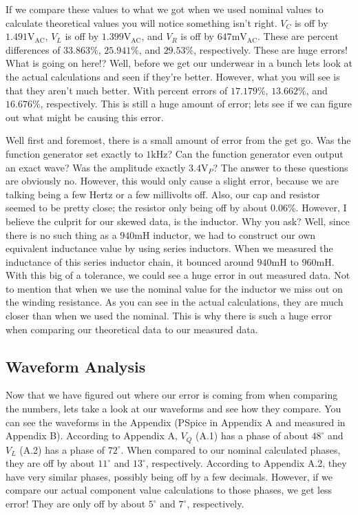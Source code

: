 \documentclass[12pt,a4paper,titlepage]{article}
\begin{document}
If we compare these values to what we got when we used nominal values to
calculate theoretical values you will notice something isn't right. $V_C$ is off
by $1.491\si{\volt}_\text{AC}$, $V_L$ is off by $1.399\si{\volt}_\text{AC}$, and $V_R$ is off by $647\si{\milli \volt}_\text{AC}$.
These are percent differences of $33.863\%$, $25.941\%$, and $29.53\%$,
respectively. These are huge errors! What is going on here!? Well, before we
get our underwear in a bunch lets look at the actual calculations and seen if
they're better. However, what you will see is that they aren't much better.
With percent errors of $17.179\%$, $13.662\%$, and $16.676\%$, respectively.
This is still a huge amount of error; lets see if we can figure out what might
be causing this error.

Well first and foremost, there is a small amount of error from the get go. Was
the function generator set exactly to $1\si{\kilo \hertz}$? Can the function generator even
output an exact wave? Was the amplitude exactly $3.4\si{\volt}_{P}$? The answer to these
questions are obviously no. However, this would only cause a slight error,
because we are talking being a few Hertz or a few millivolts off. Also, our
cap and resistor seemed to be pretty close; the resistor only being off by about
$0.06\%$. However, I believe the culprit for our skewed data, is the inductor.
Why you ask? Well, since there is no such thing as a $940\si{\milli \henry}$ inductor, we had
to construct our own equivalent inductance value by using series inductors.
When we measured the inductance of this series inductor chain, it bounced around
$940\si{\milli \henry}$ to $960\si{\milli \henry}$. With this big of a tolerance, we could see a huge error in
out measured data. Not to mention that when we use the nominal value for the
inductor we miss out on the winding resistance. As you can see in the actual
calculations, they are much closer than when we used the nominal.
This is why there is such a huge error when comparing our theoretical data to
our measured data.

\subsection{Waveform Analysis}
Now that we have figured out where our error is coming from when comparing the
numbers, lets take a look at our waveforms and see how they compare. You can see
the waveforms in the Appendix (PSpice in Appendix A and measured in Appendix B).
According to Appendix A, $V_Q$ (A.1) has a phase of about $48^{\circ}$ and $V_L$ (A.2) has
a phase of $72^{\circ}$. When compared to our nominal calculated phases, they are off by
about $11^{\circ}$ and $13^{\circ}$, respectively. According to Appendix A.2,
they have very similar phases, possibly being off by a few decimals. However, if
we compare our actual component value calculations to those phases, we get less
error! They are only off by about $5^{\circ}$ and $7^{\circ}$, respectively.
\end{document}
